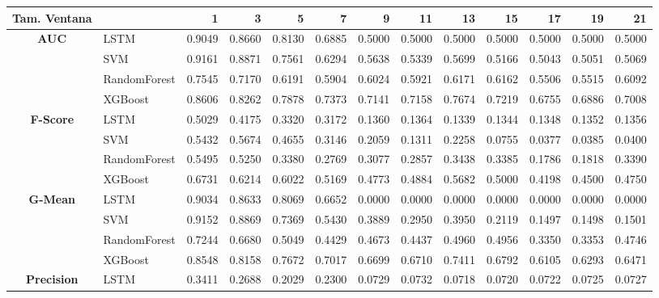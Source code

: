 \begin{table}[h]
\centering
\begin{adjustbox}{max width=15cm}
	\begin{tabular}{|c|l|r|r|r|r|r|r|r|r|r|r|r|}
		\hline
		\textbf{Tam. Ventana} &         &      1  &      3  &      5  &      7  &      9  &      11 &      13 &      15 &      17 &      19 &      21 \\
		\hline
		\textbf{AUC} & LSTM &  0.9049 &  0.8660 &  0.8130 &  0.6885 &  0.5000 &  0.5000 &  0.5000 &  0.5000 &  0.5000 &  0.5000 &  0.5000 \\
		& SVM &  0.9161 &  0.8871 &  0.7561 &  0.6294 &  0.5638 &  0.5339 &  0.5699 &  0.5166 &  0.5043 &  0.5051 &  0.5069 \\
		& RandomForest &  0.7545 &  0.7170 &  0.6191 &  0.5904 &  0.6024 &  0.5921 &  0.6171 &  0.6162 &  0.5506 &  0.5515 &  0.6092 \\
		& XGBoost &  0.8606 &  0.8262 &  0.7878 &  0.7373 &  0.7141 &  0.7158 &  0.7674 &  0.7219 &  0.6755 &  0.6886 &  0.7008 \\
		\hline
		\textbf{F-Score} & LSTM &  0.5029 &  0.4175 &  0.3320 &  0.3172 &  0.1360 &  0.1364 &  0.1339 &  0.1344 &  0.1348 &  0.1352 &  0.1356 \\
		& SVM &  0.5432 &  0.5674 &  0.4655 &  0.3146 &  0.2059 &  0.1311 &  0.2258 &  0.0755 &  0.0377 &  0.0385 &  0.0400 \\
		& RandomForest &  0.5495 &  0.5250 &  0.3380 &  0.2769 &  0.3077 &  0.2857 &  0.3438 &  0.3385 &  0.1786 &  0.1818 &  0.3390 \\
		& XGBoost &  0.6731 &  0.6214 &  0.6022 &  0.5169 &  0.4773 &  0.4884 &  0.5682 &  0.5000 &  0.4198 &  0.4500 &  0.4750 \\
		\hline
		\textbf{G-Mean} & LSTM &  0.9034 &  0.8633 &  0.8069 &  0.6652 &  0.0000 &  0.0000 &  0.0000 &  0.0000 &  0.0000 &  0.0000 &  0.0000 \\
		& SVM &  0.9152 &  0.8869 &  0.7369 &  0.5430 &  0.3889 &  0.2950 &  0.3950 &  0.2119 &  0.1497 &  0.1498 &  0.1501 \\
		& RandomForest &  0.7244 &  0.6680 &  0.5049 &  0.4429 &  0.4673 &  0.4437 &  0.4960 &  0.4956 &  0.3350 &  0.3353 &  0.4746 \\
		& XGBoost &  0.8548 &  0.8158 &  0.7672 &  0.7017 &  0.6699 &  0.6710 &  0.7411 &  0.6792 &  0.6105 &  0.6293 &  0.6471 \\
		\hline
		\textbf{Precision} & LSTM &  0.3411 &  0.2688 &  0.2029 &  0.2300 &  0.0729 &  0.0732 &  0.0718 &  0.0720 &  0.0722 &  0.0725 &  0.0727 \\

\end{tabular}
\end{adjustbox}
\end{table}
